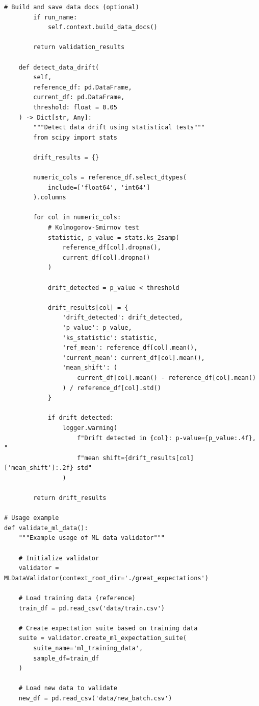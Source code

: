 \begin{lstlisting}[style=python, caption=Comprehensive Data Validation with Great Expectations]
        # Build and save data docs (optional)
        if run_name:
            self.context.build_data_docs()

        return validation_results

    def detect_data_drift(
        self,
        reference_df: pd.DataFrame,
        current_df: pd.DataFrame,
        threshold: float = 0.05
    ) -> Dict[str, Any]:
        """Detect data drift using statistical tests"""
        from scipy import stats

        drift_results = {}

        numeric_cols = reference_df.select_dtypes(
            include=['float64', 'int64']
        ).columns

        for col in numeric_cols:
            # Kolmogorov-Smirnov test
            statistic, p_value = stats.ks_2samp(
                reference_df[col].dropna(),
                current_df[col].dropna()
            )

            drift_detected = p_value < threshold

            drift_results[col] = {
                'drift_detected': drift_detected,
                'p_value': p_value,
                'ks_statistic': statistic,
                'ref_mean': reference_df[col].mean(),
                'current_mean': current_df[col].mean(),
                'mean_shift': (
                    current_df[col].mean() - reference_df[col].mean()
                ) / reference_df[col].std()
            }

            if drift_detected:
                logger.warning(
                    f"Drift detected in {col}: p-value={p_value:.4f}, "
                    f"mean shift={drift_results[col]['mean_shift']:.2f} std"
                )

        return drift_results

# Usage example
def validate_ml_data():
    """Example usage of ML data validator"""

    # Initialize validator
    validator = MLDataValidator(context_root_dir='./great_expectations')

    # Load training data (reference)
    train_df = pd.read_csv('data/train.csv')

    # Create expectation suite based on training data
    suite = validator.create_ml_expectation_suite(
        suite_name='ml_training_data',
        sample_df=train_df
    )

    # Load new data to validate
    new_df = pd.read_csv('data/new_batch.csv')


\end{lstlisting}
